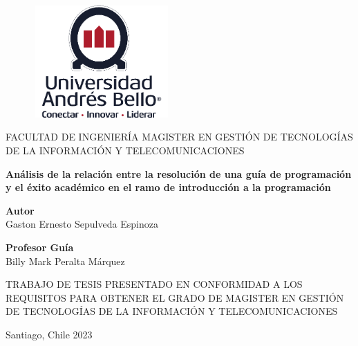 \begin{titlepage}
    \begin{figure}[h]
        \centering
        \includegraphics[width=2.06111in,height=1.68611in]{img/image1.png}
    \end{figure}

    \begin{center}
        \LARGE
        FACULTAD DE INGENIERÍA
        MAGISTER EN GESTIÓN DE TECNOLOGÍAS DE LA INFORMACIÓN Y TELECOMUNICACIONES

        
        \Huge
        \textbf{Análisis de la relación entre la resolución de una guía de programación y el éxito académico en el ramo de introducción a la programación}




        \textbf{Autor}\\
        Gaston Ernesto Sepulveda Espinoza


        \textbf{Profesor Guía}\\
        Billy Mark Peralta Márquez

        \begin{flushright}
            TRABAJO DE TESIS PRESENTADO EN CONFORMIDAD 
            A LOS REQUISITOS PARA OBTENER EL GRADO DE 
            MAGISTER EN GESTIÓN DE TECNOLOGÍAS DE LA INFORMACIÓN Y TELECOMUNICACIONES
        \end{flushright}


        \Large
        Santiago, Chile 2023         

    \end{center}
\end{titlepage}
